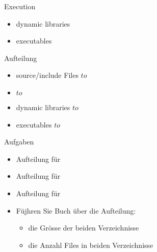 \documentclass{beamer}
\begin{document}
\begin{frame}{Execution}
 \begin{itemize}
  \item dynamic libraries 
  \item executables
 \end{itemize}
\end{frame}

\begin{frame}{Aufteilung}
 \begin{itemize}
  \item source/include Files $to$ \host
  \item {}  $to$ \host
  \item dynamic libraries  $to$ \targetS
  \item executables $to$ \targetS 
 \end{itemize}
\end{frame}

\begin{frame}{Aufgaben}
 \begin{itemize}
  \item Aufteilung für 
  \item Aufteilung für 
  \item Aufteilung für 
 \end{itemize}
 \begin{itemize}
  \item Füjhren Sie Buch über die Aufteilung:
  \begin{itemize}
   \item die Grösse der beiden Verzeichnisse
   \item die Anzahl Files in beiden Verzeichnisse
  \end{itemize}
 \end{itemize}
\end{frame}
\end{document}
